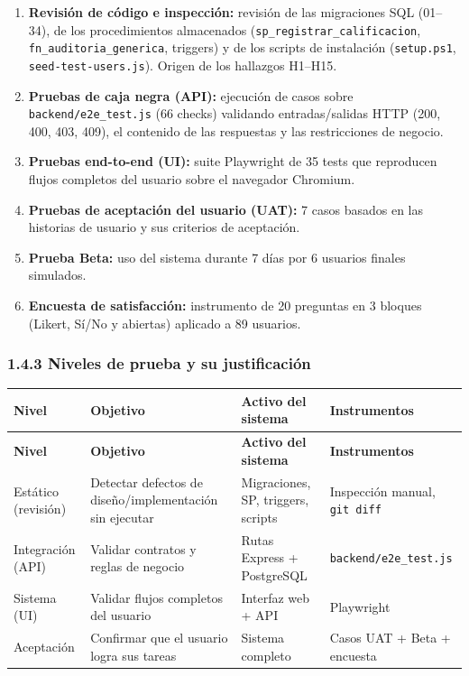 \documentclass[11pt,a4paper]{article}
\begin{document}
\begin{enumerate}[leftmargin=*]
\item \textbf{Revisión de código e inspección:} revisión de las migraciones SQL (01--34), de los procedimientos almacenados (\texttt{sp\_registrar\_calificacion}, \texttt{fn\_auditoria\_generica}, triggers) y de los scripts de instalación (\texttt{setup.ps1}, \texttt{seed-test-users.js}). Origen de los hallazgos H1--H15.
\item \textbf{Pruebas de caja negra (API):} ejecución de casos sobre \texttt{backend/e2e\_test.js} (66 checks) validando entradas/salidas HTTP (200, 400, 403, 409), el contenido de las respuestas y las restricciones de negocio.
\item \textbf{Pruebas end-to-end (UI):} suite Playwright de 35 tests que reproducen flujos completos del usuario sobre el navegador Chromium.
\item \textbf{Pruebas de aceptación del usuario (UAT):} 7 casos basados en las historias de usuario y sus criterios de aceptación.
\item \textbf{Prueba Beta:} uso del sistema durante 7 días por 6 usuarios finales simulados.
\item \textbf{Encuesta de satisfacción:} instrumento de 20 preguntas en 3 bloques (Likert, Sí/No y abiertas) aplicado a 89 usuarios.
\end{enumerate}


\subsubsection*{1.4.3 Niveles de prueba y su justificación}


{\small
\begin{longtable}{|p{}|p{}|p{}|p{}|}
\rowcolor{UTECblue}\color{white}\bfseries Nivel & \color{white}\bfseries Objetivo & \color{white}\bfseries Activo del sistema & \color{white}\bfseries Instrumentos \\ \hline
\endfirsthead
\rowcolor{UTECblue}\color{white}\bfseries Nivel & \color{white}\bfseries Objetivo & \color{white}\bfseries Activo del sistema & \color{white}\bfseries Instrumentos \\ \hline
\endhead
Estático (revisión) & Detectar defectos de diseño/implementación sin ejecutar & Migraciones, SP, triggers, scripts & Inspección manual, \texttt{git diff} \\ \hline
Integración (API) & Validar contratos y reglas de negocio & Rutas Express + PostgreSQL & \texttt{backend/e2e\_test.js} \\ \hline
Sistema (UI) & Validar flujos completos del usuario & Interfaz web + API & Playwright \\ \hline
Aceptación & Confirmar que el usuario logra sus tareas & Sistema completo & Casos UAT + Beta + encuesta \\ \hline
\end{longtable}}
\end{document}
